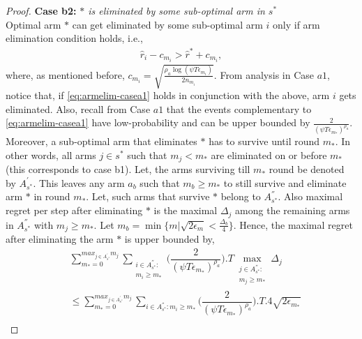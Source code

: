 \begin{proof}
\textbf{Case b2:} \textit{${*}$ is eliminated by some sub-optimal arm in $s^*$} \\
Optimal arm $*$ can get eliminated by some sub-optimal arm $i$ only if arm elimination condition holds, i.e., 
\begin{align*}
\hat r_{i} - c_{m_i} > \hat{r}^{*}+ c_{m_i},
\end{align*}
where, as mentioned before, $c_{m_i}  =\sqrt{\frac{\rho_{a}\log (\psi T\epsilon_{m_{i}})}{2 n_{m_i}}}$.
From analysis in Case $a1$, notice that, if \eqref{eq:armelim-casea1} holds in conjunction with the above, arm $i$ gets eliminated. Also, recall from Case $a1$ that the events complementary to \eqref{eq:armelim-casea1} have low-probability and can be upper bounded by $\frac{2}{(\psi  T\epsilon_{m_{*}})^{\rho_{a}}}$. Moreover, a sub-optimal arm that eliminates $*$ has to survive until round $m_*$. In other words, all arms ${j}\in s^{*}$ such that $m_{j} < m_{*}$ are eliminated on or before $m_*$ (this corresponds to case b1). Let, the arms surviving till $m_{*}$ round be denoted by $A^{'}_{s^{*}}$. This leaves any arm $a_{b}$ such that $m_{b}\geq m_{*} $ to still survive and eliminate arm ${*}$ in round $m_{*}$. Let, such arms that survive ${*}$ belong to $A^{''}_{s^{*}}$. Also maximal regret per step after eliminating ${*}$ is the maximal $\Delta_{j}$ among the remaining arms in $A^{''}_{s^{*}}$ with $m_{j}\geq m_{*}$.  Let $m_{b}=\min\lbrace m|\sqrt{2\epsilon_{m}}<\frac{\Delta_{b}}{4}\rbrace$. Hence, the maximal regret after eliminating the arm ${*}$ is upper bounded by, 
\begin{align*}
&\sum_{m_{*}=0}^{max_{j\in A^{'}_{s^{*}}}m_{j}}\sum_{\substack{i\in A^{''}_{s^{*}}: \\ m_{i}\geq m_{*}}}\bigg(\dfrac{2}{(\psi  T\epsilon_{m_{*}})^{\rho_{a}}} \bigg).T\max_{\substack{j\in A^{''}_{s^{*}}: \\ m_{j}\geq m_{*}}}{\Delta}_{j}\\
&\leq\sum_{m_{*}=0}^{max_{j\in A^{'}_{s^{*}}}m_{j}}\sum_{i\in A^{''}_{s^{*}}:m_{i} \geq m_{*}}\bigg(\dfrac{2}{(\psi  T\epsilon_{m_{*}})^{\rho_{a}}} \bigg).T.4\sqrt{2\epsilon_{m_{*}}} \\

\end{align*}
\end{proof}
